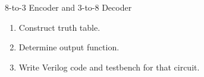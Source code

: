 \documentclass{vhdl-assignment}
\begin{document}
\begin{problem}{8-to-3 Encoder and 3-to-8 Decoder}
    \begin{enumerate}
        \item Construct truth table.
        \item Determine output function.
        \item Write Verilog code and testbench for that circuit.
    \end{enumerate}


                
                
                
                
                

\end{problem}
\end{document}
